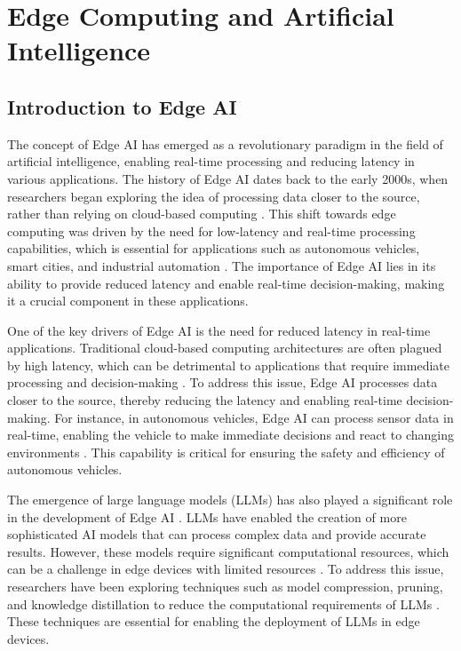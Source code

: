 \documentclass[11pt]{article}
\begin{document}
\section{Edge Computing and Artificial Intelligence}

\subsection{Introduction to Edge AI}

The concept of Edge AI has emerged as a revolutionary paradigm in the field of artificial intelligence, enabling real-time processing and reducing latency in various applications. The history of Edge AI dates back to the early 2000s, when researchers began exploring the idea of processing data closer to the source, rather than relying on cloud-based computing \cite{ref2}. This shift towards edge computing was driven by the need for low-latency and real-time processing capabilities, which is essential for applications such as autonomous vehicles, smart cities, and industrial automation \cite{ref19}. The importance of Edge AI lies in its ability to provide reduced latency and enable real-time decision-making, making it a crucial component in these applications.

One of the key drivers of Edge AI is the need for reduced latency in real-time applications. Traditional cloud-based computing architectures are often plagued by high latency, which can be detrimental to applications that require immediate processing and decision-making \cite{ref163}. To address this issue, Edge AI processes data closer to the source, thereby reducing the latency and enabling real-time decision-making. For instance, in autonomous vehicles, Edge AI can process sensor data in real-time, enabling the vehicle to make immediate decisions and react to changing environments \cite{ref164}. This capability is critical for ensuring the safety and efficiency of autonomous vehicles.

The emergence of large language models (LLMs) has also played a significant role in the development of Edge AI \cite{ref165}. LLMs have enabled the creation of more sophisticated AI models that can process complex data and provide accurate results. However, these models require significant computational resources, which can be a challenge in edge devices with limited resources \cite{ref166}. To address this issue, researchers have been exploring techniques such as model compression, pruning, and knowledge distillation to reduce the computational requirements of LLMs \cite{ref167}. These techniques are essential for enabling the deployment of LLMs in edge devices.
\end{document}
